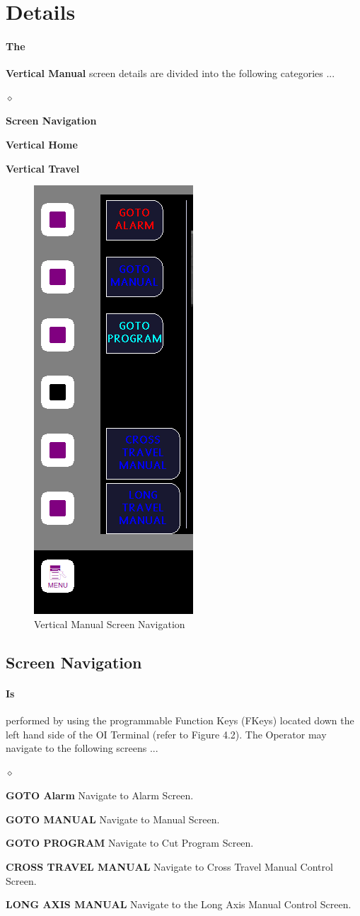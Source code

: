 \section{Details}\paragraph*{The}\textbf{Vertical Manual} screen details are divided into the following categories ...
\begin{list}{$\diamond$}{}
	\item \textbf{Screen Navigation}
	\item \textbf{Vertical Home}
	\item \textbf{Vertical Travel}
\end{list}
\begin{figure}
	\centering
	\includegraphics[width=0.2\linewidth]{screen-captures/manual/vert-manual-nav}
	\caption{Vertical Manual Screen Navigation}
	\label{fig:manual-vertical-screen-nav}
\end{figure}
\subsection{Screen Navigation}\paragraph*{Is}performed by using the programmable Function Keys (FKeys) located down the left hand side of the OI Terminal (refer to Figure 4.2). The Operator may navigate to the following screens ...
\begin{list}{$\diamond$}{}
	\item \textbf{GOTO Alarm} Navigate to Alarm Screen.
	\item \textbf{GOTO MANUAL} Navigate to Manual Screen.
	\item \textbf{GOTO PROGRAM} Navigate to Cut Program Screen.
	\item \textbf{CROSS TRAVEL MANUAL} Navigate to Cross Travel Manual Control Screen.
	\item \textbf{LONG AXIS MANUAL} Navigate to the Long Axis Manual Control Screen.
\end{list}
